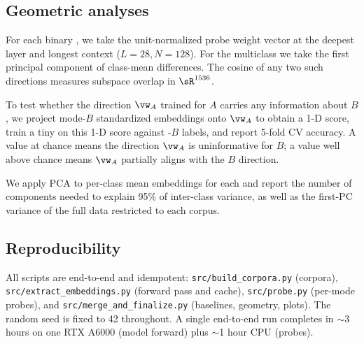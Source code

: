 \subsection{Geometric analyses}

 For each binary \modes, we take the unit-normalized probe weight vector at the deepest layer and longest context ($L=28, N=128$). For the multiclass \authorship \modes we take the first principal component of class-mean differences. The cosine of any two such directions measures subspace overlap in $\sR^{1536}$.

 To test whether the direction $\vw_A$ trained for \modes $A$ carries any information about \modes $B$, we project mode-$B$ standardized embeddings onto $\vw_A$ to obtain a 1-D score, train a tiny \logreg on this 1-D score against \modes-$B$ labels, and report 5-fold CV accuracy. A value at chance means the direction $\vw_A$ is uninformative for $B$; a value well above chance means $\vw_A$ partially aligns with the $B$ direction.

 We apply PCA to per-class mean embeddings for each \modes and report the number of components needed to explain 95\% of inter-class variance, as well as the first-PC variance of the full data restricted to each \modes corpus.

\subsection{Reproducibility}

All scripts are end-to-end and idempotent: \texttt{src/build\_corpora.py} (corpora), \texttt{src/extract\_embeddings.py} (forward pass and cache), \texttt{src/probe.py} (per-mode probes), and \texttt{src/merge\_and\_finalize.py} (baselines, geometry, plots). The random seed is fixed to 42 throughout. A single end-to-end run completes in $\sim$3 hours on one RTX A6000 (model forward) plus $\sim$1 hour CPU (probes).
